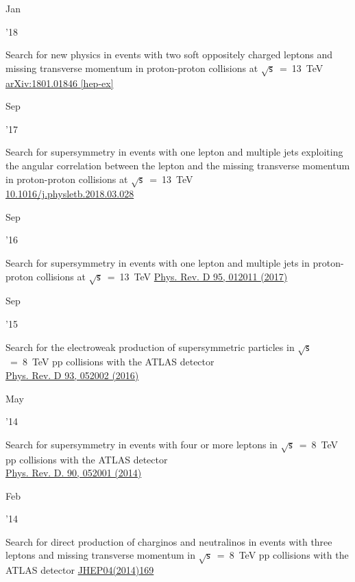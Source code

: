 \documentclass[]{cv} %
\begin{document}
\begin{entrylist}

  \entry
  {\parbox[t]{\parboxWidthOne}{Jan}\parbox[t]{\parboxWidthTwo}{\hfill '18}}
  {Search for new physics in events with two soft oppositely charged leptons and missing transverse momentum in proton-proton collisions at $\sqrt{\mathsf{s}}$~=~13~TeV}
    {\href{https://arxiv.org/abs/1801.01846}{arXiv:1801.01846 [hep-ex]}}
  {\vspace*{\spacingPubs}}

  \entry
  {\parbox[t]{\parboxWidthOne}{Sep}\parbox[t]{\parboxWidthTwo}{\hfill '17}}
  {Search for supersymmetry in events with one lepton and multiple jets exploiting the angular correlation between the lepton and the missing transverse momentum in proton-proton collisions at $\sqrt{\mathsf{s}}$~=~13~TeV\\}
    {\href{http://dx.doi.org/10.1016/j.physletb.2018.03.028}{10.1016/j.physletb.2018.03.028}}
  {\vspace*{\spacingPubs}}

  \entry
  {\parbox[t]{\parboxWidthOne}{Sep}\parbox[t]{\parboxWidthTwo}{\hfill '16}}
  {Search for supersymmetry in events with one lepton and multiple jets in proton-proton collisions at $\sqrt{\mathsf{s}}$~=~13~TeV}
    {\href{https://journals.aps.org/prd/abstract/10.1103/PhysRevD.95.012011}{Phys. Rev. D 95, 012011 (2017)}}
  {\vspace*{\spacingPubs}}

  \entry
  {\parbox[t]{\parboxWidthOne}{Sep}\parbox[t]{\parboxWidthTwo}{\hfill '15}}
  {Search for the electroweak production of supersymmetric particles in
    $\sqrt{\mathsf{s}}$~=~8~TeV pp collisions with the ATLAS detector\\}
    {\href{https://journals.aps.org/prd/abstract/10.1103/PhysRevD.93.052002}{Phys. Rev. D 93, 052002 (2016)}}
  {\vspace*{\spacingPubs}}

  \entry
  {\parbox[t]{\parboxWidthOne}{May}\parbox[t]{\parboxWidthTwo}{\hfill '14}}
  {Search for supersymmetry in events with four or more leptons in $\sqrt{\mathsf{s}}$~=~8~TeV pp collisions with the ATLAS detector\\}
  {\href{https://journals.aps.org/prd/abstract/10.1103/PhysRevD.90.052001}{Phys. Rev. D. 90, 052001 (2014)}}
  {\vspace*{\spacingPubs}}

  \entry
  {\parbox[t]{\parboxWidthOne}{Feb}\parbox[t]{\parboxWidthTwo}{\hfill '14}}
  {Search for direct production of charginos and neutralinos in events with three leptons and missing transverse momentum in $\sqrt{\mathsf{s}}$~=~8~TeV pp collisions with the ATLAS detector}
{\href{https://link.springer.com/article/10.1007\%2FJHEP04\%282014\%29169}{JHEP04(2014)169}}
{\vspace*{\spacingPubs}}


\end{entrylist}
\end{document}

